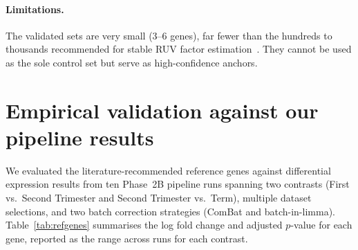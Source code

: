 \documentclass[11pt,a4paper]{article}
\begin{document}
\paragraph{Limitations.}
The validated sets are very small (3--6 genes), far fewer than the
hundreds to thousands recommended for stable RUV factor
estimation~\cite{risso2014}.  They cannot be used as the sole control
set but serve as high-confidence anchors.


\section{Empirical validation against our pipeline results}

We evaluated the literature-recommended reference genes against
differential expression results from ten Phase~2B pipeline runs
spanning two contrasts (First vs.\ Second Trimester and Second
Trimester vs.\ Term), multiple dataset selections, and two batch
correction strategies (ComBat and batch-in-limma).
Table~\ref{tab:refgenes} summarises the log fold change and adjusted
$p$-value for each gene, reported as the range across runs for each
contrast.
\end{document}

